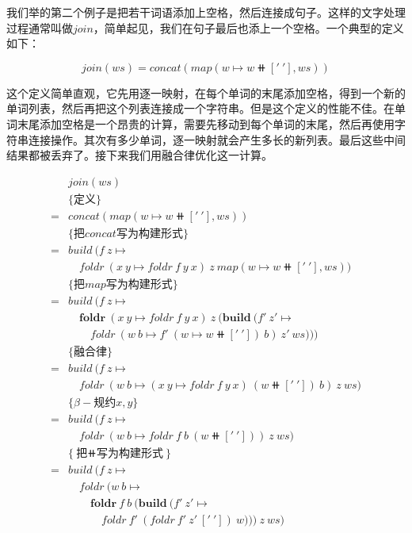 \documentclass[b5paper]{ctexart}
\begin{document}
\begin{example}
我们举的第二个例子是把若干词语添加上空格，然后连接成句子。这样的文字处理过程通常叫做$join$，简单起见，我们在句子最后也添上一个空格。一个典型的定义如下：

\[
join(ws) = concat(map(w \mapsto w \doubleplus ['\ '], ws))
\]

这个定义简单直观，它先用逐一映射，在每个单词的末尾添加空格，得到一个新的单词列表，然后再把这个列表连接成一个字符串。但是这个定义的性能不佳。在单词末尾添加空格是一个昂贵的计算，需要先移动到每个单词的末尾，然后再使用字符串连接操作。其次有多少单词，逐一映射就会产生多长的新列表。最后这些中间结果都被丢弃了。接下来我们用融合律优化这一计算。

\[ \begin{array}{rl}
  & join(ws) \\
  & \{\text{定义} \} \\
= & concat(map(w \mapsto w \doubleplus ['\ '], ws)) \\

  & \{\text{把$concat$写为构建形式}\} \\
= & build\ (f\ z \mapsto \\
  & \quad foldr\ (x\ y \mapsto foldr\ f\ y\ x)\ z\ map(w \mapsto w \doubleplus ['\ '], ws)) \\

  & \{\text{把$map$写为构建形式}\} \\
= & build\ (f\ z \mapsto \\
  & \quad \pmb{foldr}\ (x\ y \mapsto foldr\ f\ y\ x)\ z\ (\pmb{build}\ (f'\ z' \mapsto \\
  & \quad \quad foldr\ (w\ b \mapsto f'\ (w \mapsto w \doubleplus ['\ '])\ b)\ z'\ ws))) \\

  & \{\text{融合律}\} \\
= & build\ (f\ z \mapsto \\
  & \quad foldr\ (w\ b \mapsto (x\ y \mapsto foldr\ f\ y\ x)\ (w \doubleplus ['\ '])\ b)\ z\ ws) \\

  & \{\beta-\text{规约}x, y\} \\
= & build\ (f\ z \mapsto \\
  & \quad foldr\ (w\ b \mapsto foldr\ f\ b\ (w \doubleplus ['\ ']))\ z\ ws) \\

  & \{\text{把$\doubleplus$写为构建形式}\} \\
= & build\ (f\ z \mapsto \\
  & \quad foldr\ (w\ b \mapsto \\
  & \quad \quad \pmb{foldr}\ f\ b\ (\pmb{build}\ (f'\ z' \mapsto \\
  & \quad \quad \quad foldr\ f'\ (foldr\ f'\ z'\ ['\ '])\ w)))\ z\ ws) \\


\end{array}\]
\end{example}
\end{document}
